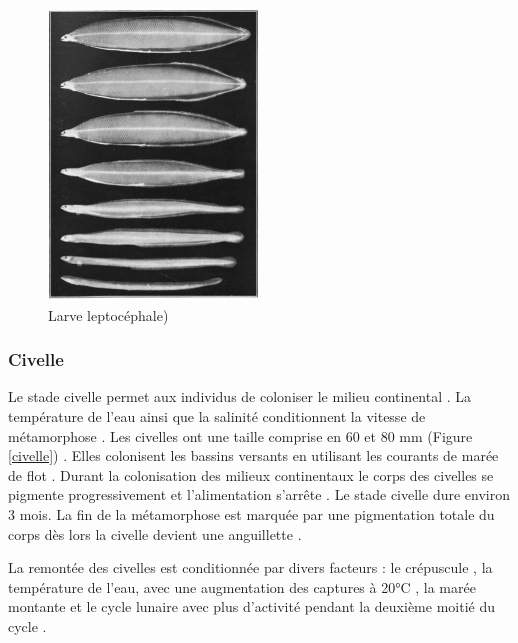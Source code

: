 \documentclass[11pt,titlepage,twoside]{article}\usepackage[]{graphicx}\usepackage[table]{xcolor}
\begin{document}
\begin{figure}[htpb]
\centering
\includegraphics[width=0.5\textwidth]{larve}
\caption{Larve leptocéphale)}
\label{larve}
\end{figure}

\subsubsection{Civelle}

Le stade civelle permet aux individus de coloniser le milieu continental \citep{edeline_role_2005}. La température de l’eau ainsi que la salinité conditionnent la vitesse de métamorphose \citep{laffaille_point_2005}. Les civelles ont une taille comprise en 60 et 80 mm (Figure \ref{civelle}) \citep{adam_anguille_2008}.  Elles colonisent les bassins versants en utilisant les courants de marée de flot \citep{hirschinger_donnees_2015}. Durant la colonisation des milieux continentaux le corps des civelles se pigmente progressivement \citep{prouzet_etude_2003} et l’alimentation s’arrête \citep{prouzet_historique_2002} . Le stade civelle dure environ 3 mois. La fin de la métamorphose est marquée par une pigmentation totale du corps dès lors la civelle devient une anguillette \citep{laffaille_role_2000}.

La remontée des civelles est conditionnée par divers facteurs : le crépuscule \citep{bardonnet_influence_2003, bardonnet_etude_2005}, la température de l’eau, avec une augmentation des captures à 20°C \citep{white_environmental_1997}, la marée montante \citep{bardonnet_influence_2003} et le cycle lunaire avec plus d’activité pendant la deuxième moitié du cycle \citep{todd_timing_1981}. 
\end{document}
